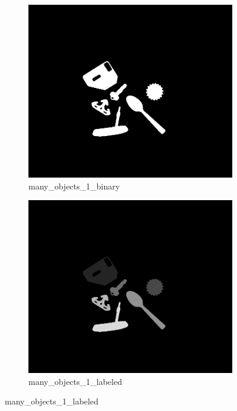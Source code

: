 \documentclass[bwprint]{gmcmthesis}
\numberwithin{figure}{section}
\begin{document}
\begin{enumerate}[label=\alph*.]
\begin{figure}[h]
\begin{subfigure}[b]{0.3\textwidth}
            \includegraphics[width=\textwidth]{../output/many_objects_1_binary.png}
            \caption{many\_objects\_1\_binary}
            \label{fig:subfigure2}
        \end{subfigure}
        \hfill
        \begin{subfigure}[b]{0.3\textwidth}
            \centering
            \includegraphics[width=\textwidth]{../output/many_objects_1_labeled.png}
            \caption{many\_objects\_1\_labeled}
            \label{fig:subfigure3}

\end{subfigure}
\end{figure}
\end{enumerate}
\end{document}
